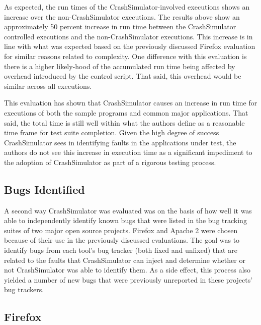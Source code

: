                 As expected, the run times of the CrashSimulator-involved executions shows an increase over the
                non-CrashSimulator executions. The results above show an approximately 50 percent increase in run time
                between the CrashSimulator controlled executions and the non-CrashSimulator executions. This increase is
                in line with what was expected based on the previously discussed Firefox evaluation for similar reasons
                related to complexity. One difference with this evaluation is there is a higher likely-hood of the
                accumulated run time being affected by overhead introduced by the control script. That said, this
                overhead would be similar across all executions.

                This evaluation has shown that CrashSimulator causes an increase in run time for executions of both the
                sample programs and common major applications. That said, the total time is still well within what the
                authors define as a reasonable time frame for test suite completion. Given the high degree of success
                CrashSimulator sees in identifying faults in the applications under test, the authors do not see this
                increase in execution time as a significant impediment to the adoption of CrashSimulator as part of a
                rigorous testing process.

    \subsection{Bugs Identified}

        A second way CrashSimulator was evaluated was on the basis of how well it was able to independently identify
        known bugs that were listed in the bug tracking suites of two major open source projects. Firefox and Apache 2
        were chosen because of their use in the previously discussed evaluations. The goal was to identify bugs from
        each tool's bug tracker (both fixed and unfixed) that are related to the faults that CrashSimulator can inject
        and determine whether or not CrashSimulator was able to identify them. As a side effect, this process also
        yielded a number of new bugs that were previously unreported in these projects' bug trackers.

        \subsection{Firefox}

